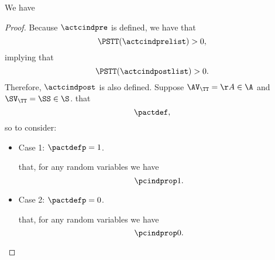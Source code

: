 \begin{proposition}
  We have \actcindpropfull
\end{proposition}

\begin{proof}
  Because $\actcindpre$ is defined,
  we have that 
  $$\PSTT(\actcindprelist) > 0,$$ 
  implying that
  $$\PSTT(\actcindpostlist) > 0.$$
  Therefore,
  $\actcindpost$ is also defined.
  Suppose 
  $\AV_\TT = \AA \in \A$
  and
  $\SV_\TT = \SS \in \S$.
   that 
  $$\pactdef,$$
  so  to consider:
  \begin{itemize}
    \item Case 1: $\pactdefp = 1$.

       that,
      for any random variables 
      \listrv
      we have
      $$\pcindprop1.$$

    \item Case 2: $\pactdefp = 0$.

       that,
      for any random variables 
      \listrv
      we have
      $$\pcindprop0.$$
  \end{itemize}
\end{proof}
